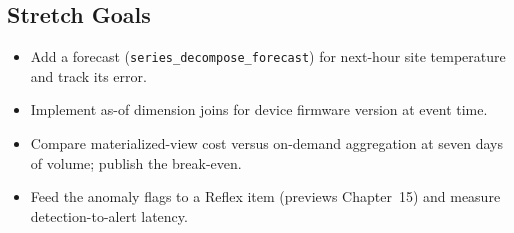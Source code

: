 \subsection*{Stretch Goals}
\begin{itemize}
    \item Add a forecast (\texttt{series\_decompose\_forecast}) for next-hour site temperature and track its error.
    \item Implement as-of dimension joins for device firmware version at event time.
    \item Compare materialized-view cost versus on-demand aggregation at seven days of volume; publish the break-even.
    \item Feed the anomaly flags to a Reflex item (previews Chapter~15) and measure detection-to-alert latency.
\end{itemize}
